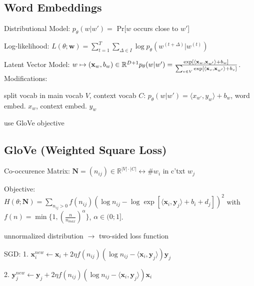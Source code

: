 \documentclass[a4paper, 11pt, landscape]{article}
\begin{document}
\begin{multicols*}{3}
    \section{Word Embeddings}
    \begin{compactdesc}
    \item[Distributional Model:] $p_\theta(w|w') = $ Pr[$w$ occurs close to $w'$]
    \item[Log-likelihood:] $L(\theta; \mathbf{w}) = \sum_{t=1}^T\sum_{\Delta \in I}{\log p_\theta(w^{(t+\Delta)}|w^{(t)})}$
    \item[Latent Vector Model:] $w \mapsto (\mathbf{x}_w, b_w) \in \mathbb{R}^{D+1} \\p_{\theta}(w|w') = \frac{\exp[\langle \mathbf{x}_w,\mathbf{x}_{w'}\rangle + b_w]}{\sum_{v\in V}{\exp[\langle \mathbf{x}_v,\mathbf{x}_{w'}\rangle + b_v ]}}$.
        Modifications:
        \begin{inparaitem}[\color{red}\textbullet]
        \item split vocab in main vocab $V$, context vocab $C$: $p_{\theta}(w|w') = \langle x_{w'}, y_{w} \rangle + b_w$, word embed. $x_w$, context embed. $y_w$
        \item use GloVe objective
        \end{inparaitem}
    \end{compactdesc}

    \subsection{GloVe (Weighted Square Loss)}
    \begin{compactdesc}
    \item[Co-occurence Matrix:]$\mathbf{N} = (n_{ij}) \in \mathbb{R}^{|V|\cdot |C|} \leftrightarrow \# w_i$ in c'txt $w_j$
    \item[Objective:] $H(\theta;\mathbf{N}) = \sum_{n_{ij} > 0} f(n_{ij})(\log n_{ij} - \log \exp[\langle \mathbf{x}_i, \mathbf{y}_j \rangle + b_i + d_j])^2$ with $f(n) = \min\{1, (\frac{n}{n_{max}})^\alpha\}$, $\alpha \in (0;1]$.
    \end{compactdesc}
    unnormalized distribution $\rightarrow$ two-sided loss function
    \begin{compactdesc}
    \item[SGD:] 1. $\mathbf{x}_i^{new} \leftarrow \mathbf{x}_i + 2\eta f(n_{ij})(\log n_{ij} - \langle \mathbf{x}_i, \mathbf{y}_j \rangle)\mathbf{y}_j$ 
    \item \hspace{26pt}2. $\mathbf{y}_j^{new} \leftarrow \mathbf{y}_j + 2\eta f(n_{ij})(\log n_{ij} - \langle \mathbf{x}_i, \mathbf{y}_j \rangle)\mathbf{x}_i$
    \end{compactdesc}


\end{multicols*}
\end{document}
